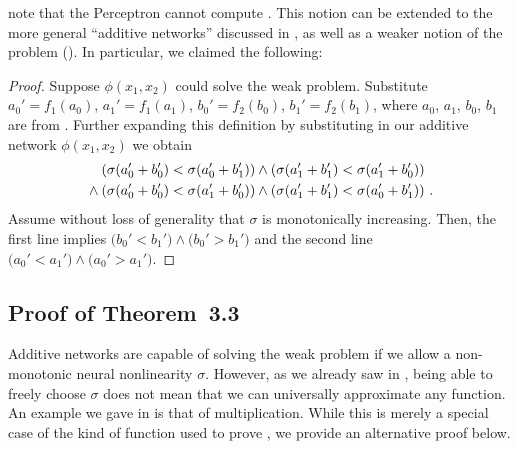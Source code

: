  note that the Perceptron cannot compute \XOR.
This notion can be extended to the more general \enquote{additive networks} discussed in , as well as a weaker notion of the \XOR problem ().
In particular, we claimed the following:

\ThmWeakXor*

\begin{proof}
Suppose $\phi(x_1, x_2)$ could solve the weak \XOR problem. Substitute $a_0' = f_1(a_0)$, $a_1' = f_1(a_1)$, $b_0' = f_2(b_0)$, $b_1' = f_2(b_1)$, where $a_0$, $a_1$, $b_0$, $b_1$ are from .
Further expanding this definition by substituting in our additive network $\phi(x_1, x_2)$ we obtain
	\begin{align*}
	&\hphantom{\wedge} \;    \left( \sigma(a_0' + b_0') < \sigma(a_0' + b_1') \right)
	 \wedge   \left( \sigma(a_1' + b_1') < \sigma(a_1' + b_0') \right) \\
	&\wedge   \left( \sigma(a_0' + b_0') < \sigma(a_1' + b_0') \right) 
	 \wedge   \left( \sigma(a_1' + b_1') < \sigma(a_0' + b_1') \right) \,.
	\end{align*}
	Assume without loss of generality that $\sigma$ is monotonically increasing. Then, the first line implies $\big(b_0' < b_1' \big) \wedge \big( b_0' > b_1' \big)$ and the second line $\big(a_0' < a_1' \big) \wedge \big( a_0' > a_1' \big)$. \Lightning
\end{proof}

\subsection{Proof of Theorem~3.3}
\label{app:thm_multiplication}

Additive networks are capable of solving the weak \XOR problem if we allow a non-monotonic neural nonlinearity $\sigma$.
However, as we already saw in , being able to freely choose $\sigma$ does not mean that we can universally approximate any function.
An example we gave in  is that of multiplication.
While this is merely a special case of the kind of function used to prove , we provide an alternative proof below.

\ThmMultiplication*

